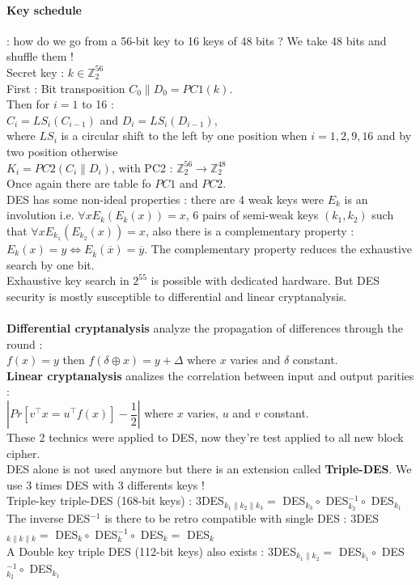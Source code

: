 \documentclass[11pt,a4paper]{report}
\begin{document}
\paragraph{Key schedule} : how do we go from a 56-bit key to 16 keys of 48 bits ? We take 48 bits and shuffle them !\\
Secret key : $k \in \mathbb{Z}_2^{56}$\\
First : Bit transposition $C_0 \parallel D_0 = PC1(k)$.\\
Then for $i = 1$ to 16 :\\
	$C_i = L S_i(C_{i-1})$ and $D_i = LS_i(D_{i-1})$,\\ where $LS_i$ is a circular shift to the left by one position when $i=1,2,9,16$ and by two position otherwise\\
	$K_i=PC2(C_i \parallel D_i)$, with PC2 : $\mathbb{Z}_2^{56} \rightarrow \mathbb{Z}_2^{48}$\\
Once again there are table fo $PC1$ and $PC2$.\\
DES has some non-ideal properties : there are 4 weak keys were $E_k$ is an involution i.e. $\forall x E_k(E_k(x)) = x$, 6 pairs of semi-weak keys $(k_1,k_2)$ such that $\forall x E_{k_1}(E_{k_2}(x)) = x$, also there is a complementary property : $E_k(x) = y \Leftrightarrow E_{\overline{k}}(\overline{x}) = \overline{y} $. The complementary property reduces the exhaustive search by one bit.\\
Exhaustive key search in $2^{55}$ is possible with dedicated hardware. But DES security is mostly susceptible to differential and linear cryptanalysis.\\
\\
\textbf{Differential cryptanalysis} analyze the propagation of differences through the round : \\
$f(x) = y$ then $f(\delta \oplus x) = y + \Delta$ where $x$ varies and $\delta$ constant.\\
\textbf{Linear cryptanalysis} analizes the correlation between input and output parities :\\
$\left\vert Pr[v^{\top} x = u^{\top}  f(x)] - \dfrac{1}{2} \right\vert$ where $x$ varies, $u$ and $v$ constant.\\
These 2 technics were applied to DES, now they're test applied to all new block cipher. \\

DES alone is not used anymore but there is an extension called \textbf{Triple-DES}. We use 3 times DES with 3 differents keys !\\
Triple-key triple-DES (168-bit keys) : 3DES$_{k_1 \parallel k_2 \parallel k_3} = $ DES$_{k_3} \circ $ DES$^{-1}_{k_2} \circ $ DES$_{k_1}$\\
The inverse DES$^{-1}$ is there to be retro compatible with single DES : 3DES$_{k \parallel k \parallel k} = $ DES$_{k} \circ $ DES$^{-1}_{k} \circ $ DES$_{k} =$ DES$_k$\\
A Double key triple DES (112-bit keys) also exists : 3DES$_{k_1 \parallel k_2 } = $ DES$_{k_1} \circ $ DES$^{-1}_{k_2} \circ $ DES$_{k_1}$\\
\end{document}
